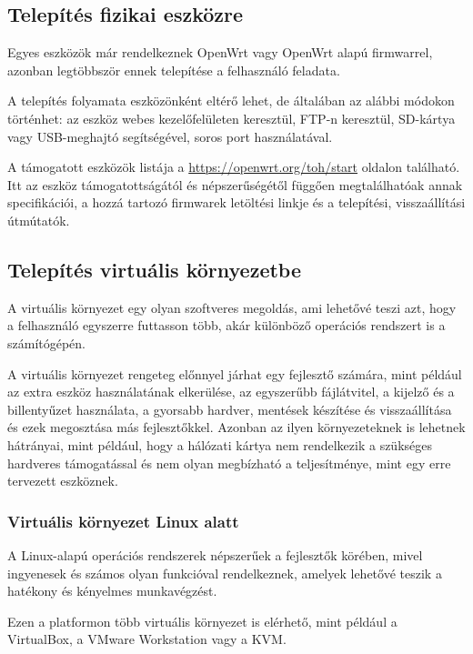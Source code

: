 \documentclass[12pt]{article}
\begin{document}
\subsection{Telepítés fizikai eszközre}

Egyes eszközök már rendelkeznek OpenWrt vagy OpenWrt alapú firmwarrel, azonban legtöbbször ennek telepítése a felhasználó feladata.

A telepítés folyamata eszközönként eltérő lehet, de általában az alábbi módokon történhet: az eszköz webes kezelőfelületen keresztül, FTP-n keresztül, SD-kártya vagy USB-meghajtó segítségével, soros port használatával.

A támogatott eszközök listája a \url{https://openwrt.org/toh/start} oldalon található. Itt az eszköz támogatottságától és népszerűségétől függően megtalálhatóak annak specifikációi, a hozzá tartozó firmwarek letöltési linkje és a telepítési, visszaállítási útmútatók.


\cite{openwrt_install}
\cite{openwrt_stock}

\subsection{Telepítés virtuális környezetbe}

A virtuális környezet egy olyan szoftveres megoldás, ami lehetővé teszi azt, hogy a felhasználó egyszerre futtasson több, akár különböző operációs rendszert is a számítógépén.

A virtuális környezet rengeteg előnnyel járhat egy fejlesztő számára, mint például az extra eszköz használatának elkerülése, az egyszerűbb fájlátvitel, a kijelző és a billentyűzet használata, a gyorsabb hardver, mentések készítése és visszaállítása és ezek megosztása más fejlesztőkkel. Azonban az ilyen környezeteknek is lehetnek hátrányai, mint például, hogy a hálózati kártya nem rendelkezik a szükséges hardveres támogatással és nem olyan megbízható a teljesítménye, mint egy erre tervezett eszköznek.

\subsubsection{Virtuális környezet Linux alatt}

A Linux-alapú operációs rendszerek népszerűek a fejlesztők körében, mivel ingyenesek és számos olyan funkcióval rendelkeznek, amelyek lehetővé teszik a hatékony és kényelmes munkavégzést.

Ezen a platformon több virtuális környezet is elérhető, mint például a VirtualBox, a VMware Workstation vagy a KVM.
\end{document}
